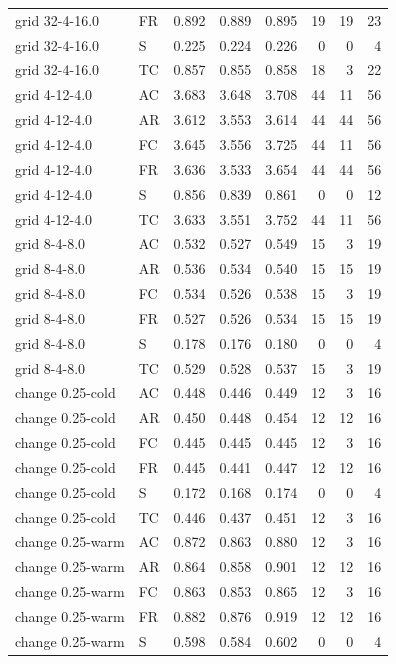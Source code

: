 \documentclass[ecta,nameyear,draft]{econsocart}
\theoremstyle{definition}
\theoremstyle{remark}
\begin{document}
\begin{longtable}{llrrrrrr}
grid 32-4-16.0 & FR & 0.892 & 0.889 & 0.895 & 19 & 19 & 23\\
grid 32-4-16.0 & S & 0.225 & 0.224 & 0.226 & 0 & 0 & 4\\
grid 32-4-16.0 & TC & 0.857 & 0.855 & 0.858 & 18 & 3 & 22\\
grid 4-12-4.0 & AC & 3.683 & 3.648 & 3.708 & 44 & 11 & 56\\
grid 4-12-4.0 & AR & 3.612 & 3.553 & 3.614 & 44 & 44 & 56\\
grid 4-12-4.0 & FC & 3.645 & 3.556 & 3.725 & 44 & 11 & 56\\
grid 4-12-4.0 & FR & 3.636 & 3.533 & 3.654 & 44 & 44 & 56\\
grid 4-12-4.0 & S & 0.856 & 0.839 & 0.861 & 0 & 0 & 12\\
grid 4-12-4.0 & TC & 3.633 & 3.551 & 3.752 & 44 & 11 & 56\\
grid 8-4-8.0 & AC & 0.532 & 0.527 & 0.549 & 15 & 3 & 19\\
grid 8-4-8.0 & AR & 0.536 & 0.534 & 0.540 & 15 & 15 & 19\\
grid 8-4-8.0 & FC & 0.534 & 0.526 & 0.538 & 15 & 3 & 19\\
grid 8-4-8.0 & FR & 0.527 & 0.526 & 0.534 & 15 & 15 & 19\\
grid 8-4-8.0 & S & 0.178 & 0.176 & 0.180 & 0 & 0 & 4\\
grid 8-4-8.0 & TC & 0.529 & 0.528 & 0.537 & 15 & 3 & 19\\
change 0.25-cold & AC & 0.448 & 0.446 & 0.449 & 12 & 3 & 16\\
change 0.25-cold & AR & 0.450 & 0.448 & 0.454 & 12 & 12 & 16\\
change 0.25-cold & FC & 0.445 & 0.445 & 0.445 & 12 & 3 & 16\\
change 0.25-cold & FR & 0.445 & 0.441 & 0.447 & 12 & 12 & 16\\
change 0.25-cold & S & 0.172 & 0.168 & 0.174 & 0 & 0 & 4\\
change 0.25-cold & TC & 0.446 & 0.437 & 0.451 & 12 & 3 & 16\\
change 0.25-warm & AC & 0.872 & 0.863 & 0.880 & 12 & 3 & 16\\
change 0.25-warm & AR & 0.864 & 0.858 & 0.901 & 12 & 12 & 16\\
change 0.25-warm & FC & 0.863 & 0.853 & 0.865 & 12 & 3 & 16\\
change 0.25-warm & FR & 0.882 & 0.876 & 0.919 & 12 & 12 & 16\\
change 0.25-warm & S & 0.598 & 0.584 & 0.602 & 0 & 0 & 4\\

\end{longtable}
\end{document}
